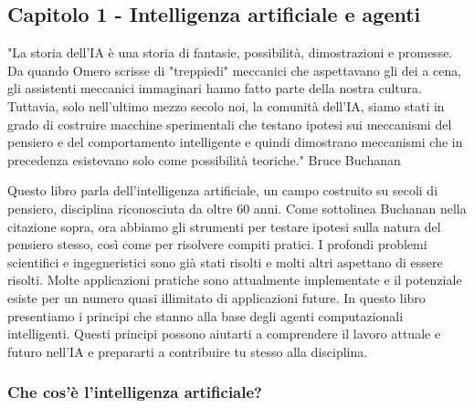 \documentclass[a4paper]{extarticle}
\begin{document}
\subsection{Capitolo 1 - Intelligenza artificiale e agenti}

\begin{center}
"La storia dell'IA è una storia di fantasie, possibilità, dimostrazioni e promesse. Da quando Omero scrisse di "treppiedi" meccanici che aspettavano gli dei a cena, gli assistenti meccanici immaginari hanno fatto parte della nostra cultura. Tuttavia, solo nell'ultimo mezzo secolo noi, la comunità dell'IA, siamo stati in grado di costruire macchine sperimentali che testano ipotesi sui meccanismi del pensiero e del comportamento intelligente e quindi dimostrano meccanismi che in precedenza esistevano solo come possibilità teoriche."
Bruce Buchanan
\end{center}

Questo libro parla dell'intelligenza artificiale, un campo costruito su secoli di pensiero, disciplina riconosciuta da oltre 60 anni. Come sottolinea Buchanan nella citazione sopra, ora abbiamo gli strumenti per testare ipotesi sulla natura del pensiero stesso, così come per risolvere compiti pratici. I profondi problemi scientifici e ingegneristici sono già stati risolti e molti altri aspettano di essere risolti. Molte applicazioni pratiche sono attualmente implementate e il potenziale esiste per un numero quasi illimitato di applicazioni future. In questo libro presentiamo i principi che stanno alla base degli agenti computazionali intelligenti. Questi principi possono aiutarti a comprendere il lavoro attuale e futuro nell'IA e prepararti a contribuire tu stesso alla disciplina.

\subsubsection{Che cos'è l'intelligenza artificiale?}
\end{document}
